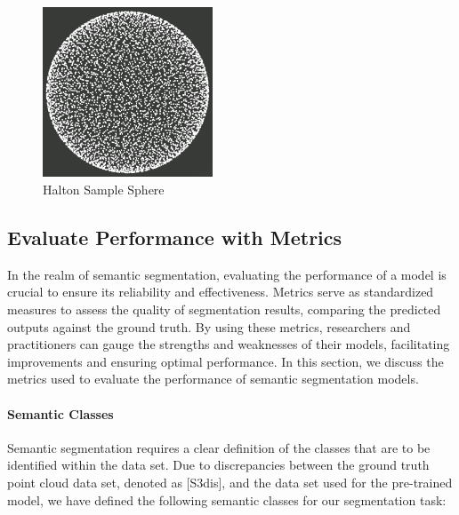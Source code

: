 \documentclass[11pt, a4paper,oneside,chapterprefix=false]{scrbook}
\begin{document}
\begin{figure}[H]
    \centering
    \includegraphics*[width=0.45\textwidth]{figures/halton sample sphere.png}
    \caption{Halton Sample Sphere}
    \label{fig:halton sample sphere}
\end{figure}

\subsection{Evaluate Performance with Metrics}

In the realm of semantic segmentation, evaluating the performance of a model is crucial to ensure its reliability and effectiveness. Metrics serve as standardized measures to assess the quality of segmentation results, comparing the predicted outputs against the ground truth. By using these metrics, researchers and practitioners can gauge the strengths and weaknesses of their models, facilitating improvements and ensuring optimal performance. In this section, we discuss the metrics used to evaluate the performance of semantic segmentation models.

\paragraph{Semantic Classes}

Semantic segmentation requires a clear definition of the classes that are to be identified within the data set. Due to discrepancies between the ground truth point cloud data set, denoted as [S3dis], and the data set used for the pre-trained model, we have defined the following semantic classes for our segmentation task:
\end{document}
